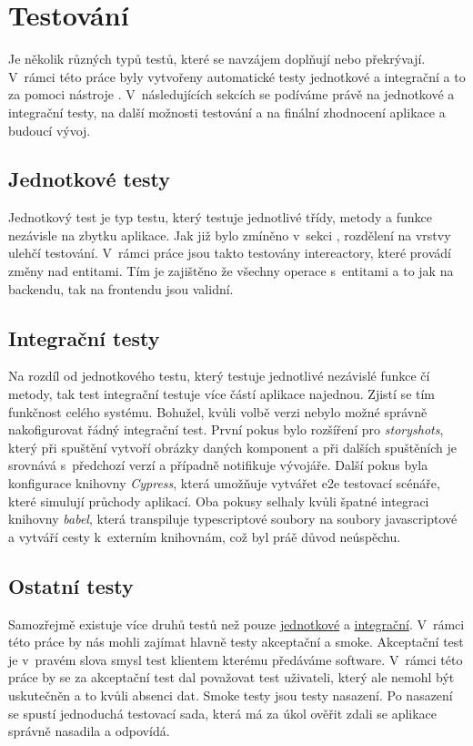 \chapter{Testování}
\label{ch:testing}
Je několik různých typů testů, které se navzájem doplňují nebo překrývají. V~rámci této práce byly vytvořeny automatické testy jednotkové a integrační a to za pomoci nástroje . V~následujících sekcích se podíváme právě na jednotkové a integrační testy, na další možnosti testování a na finální zhodnocení aplikace a budoucí vývoj.

\section{Jednotkové testy}
\label{sc:unit_tests}
Jednotkový test je typ testu, který testuje jednotlivé třídy, metody a funkce nezávisle na zbytku aplikace. Jak již bylo zmíněno v~sekci , rozdělení na vrstvy ulehčí testování. V~rámci práce jsou takto testovány intereactory, které provádí změny nad entitami. Tím je zajištěno že všechny operace s~entitami a to jak na backendu, tak na frontendu jsou validní.

\section{Integrační testy}
\label{sc:unit_tests}
Na rozdíl od jednotkového testu, který testuje jednotlivé nezávislé funkce čí metody, tak test integrační testuje více částí aplikace najednou. Zjistí se tím funkčnost celého systému. Bohužel, kvůli volbě verzi  nebylo možné správně nakofigurovat řádný integrační test. První pokus bylo rozšíření pro  \emph{storyshots}, který při spuštění vytvoří obrázky daných komponent a při dalších spuštěních je srovnává s~předchozí verzí a případně notifikuje vývojáře. Další pokus byla konfigurace knihovny \emph{Cypress}, která umožňuje vytvářet \acrfull{e2e} testovací scénáře, které simulují průchody aplikací. Oba pokusy selhaly kvůli špatné integraci knihovny \emph{babel}, která transpiluje typescriptové soubory na soubory javascriptové a vytváří cesty k~externím knihovnám, což byl práě důvod neúspěchu.

\section{Ostatní testy}
Samozřejmě existuje více druhů testů než pouze \hyperref[sc:unit_tests]{jednotkové} a \hyperref[sc:unit_tests]{integrační}. V~rámci této práce by nás mohli zajímat hlavně testy akceptační a smoke. Akceptační test je v~pravém slova smysl test klientem kterému předáváme software. V~rámci této práce by se za akceptační test dal považovat test uživateli, který ale nemohl být uskutečněn a to kvůli absenci dat. Smoke testy jsou testy nasazení. Po nasazení se spustí jednoduchá testovací sada, která má za úkol ověřit zdali se aplikace správně nasadila a odpovídá.

